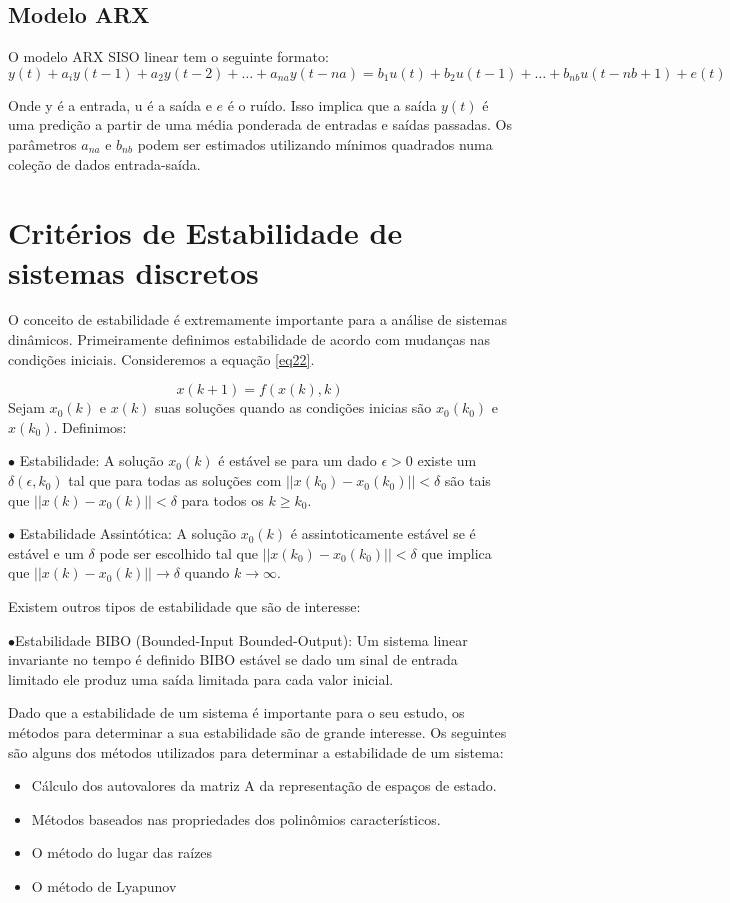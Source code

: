 \subsection{Modelo ARX}
O modelo ARX SISO linear tem o seguinte formato:
\begin{equation}\label{ARXModel}
	y(t)+a_iy(t-1)+a_2y(t-2)+\dots+a_{na}y(t-na)=
	b_1u(t)+b_2u(t-1)+\dots+b_{nb}u(t-nb+1)+e(t)
\end{equation}

Onde y é a entrada, u é a saída e $e$ é o ruído. Isso implica que a saída $y(t)$ é uma predição a partir de uma média ponderada de entradas e saídas passadas. Os parâmetros $a_{na}$ e $b_{nb}$ podem ser estimados utilizando mínimos quadrados numa coleção de dados entrada-saída.

\section{Critérios de Estabilidade de sistemas discretos}

O conceito de estabilidade é extremamente importante para a análise de sistemas dinâmicos. Primeiramente definimos  estabilidade de acordo com mudanças nas condições iniciais. Consideremos a equação \ref{eq22}.

\begin{equation} \label{eq22}
x(k+1)=f(x(k),k)
\end{equation}
Sejam $x_0(k)$ e $x(k)$ suas soluções quando as condições inicias são $x_0(k_0)$ e $x(k_0)$. Definimos:


$\bullet$ Estabilidade: A solução $x_0(k)$ é estável se para um dado $\epsilon>0$ existe um $\delta(\epsilon,k_0)$ tal que para todas as soluções com $||x(k_0)-x_0(k_0)||<\delta$ são tais que $||x(k)-x_0(k)||<\delta$ para todos os $k \geqslant k_0$.


$\bullet$ Estabilidade Assintótica: A solução $x_0(k)$ é assintoticamente estável se é estável e um $\delta$ pode ser escolhido tal que  $||x(k_0)-x_0(k_0)||<\delta$ que implica que $||x(k)-x_0(k)||\to\delta$ quando $k \to \infty$.


Existem outros tipos de estabilidade que são de interesse:


$\bullet$Estabilidade BIBO (Bounded-Input Bounded-Output): Um sistema linear invariante no tempo é definido BIBO estável se dado um sinal de entrada limitado ele produz uma saída limitada para cada valor inicial.


Dado que a estabilidade de um sistema é importante para o seu estudo, os métodos para determinar a sua estabilidade são de grande interesse. Os seguintes são alguns dos métodos utilizados para determinar a estabilidade de um sistema:
\begin{itemize}
	\item Cálculo dos autovalores da matriz A da representação de espaços de estado.
	\item Métodos baseados nas propriedades dos polinômios característicos.
	\item O método do lugar das raízes
	\item O método de Lyapunov
\end{itemize}

